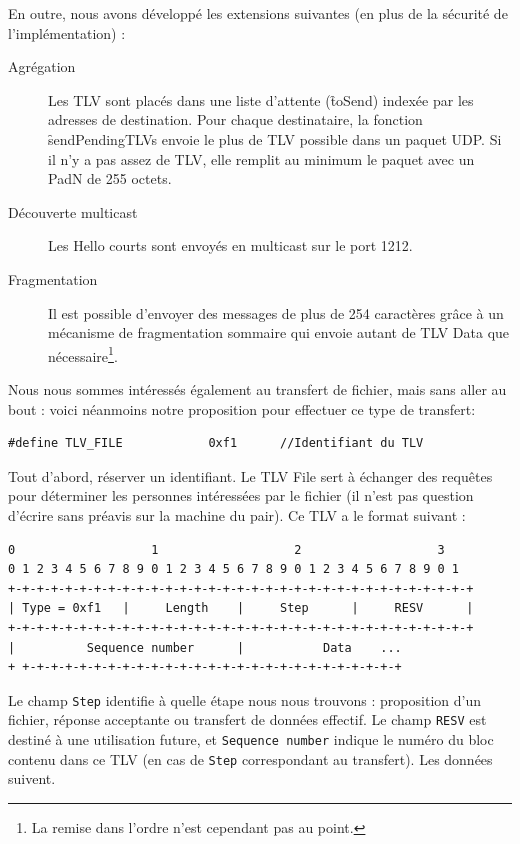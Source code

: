 \documentclass[11pt,a4paper]{article}
\begin{document}
En outre, nous avons développé les extensions suivantes (en plus de la sécurité de l'implémentation) :
\begin{description}
\item[Agrégation] Les TLV sont placés dans une liste d'attente (\f{toSend}) indexée par les adresses de destination. Pour chaque destinataire, la fonction \f{sendPendingTLVs}
envoie le plus de TLV possible dans un paquet UDP. Si il n'y a pas assez de TLV, elle remplit au minimum le paquet avec un PadN de 255 octets.
\item[Découverte multicast]Les Hello courts sont envoyés en multicast sur le port 1212.

\item[Fragmentation] Il est possible d'envoyer des messages de plus de 254 caractères grâce à un mécanisme de fragmentation sommaire qui envoie autant de 
TLV Data que nécessaire\footnote{La remise dans l'ordre n'est cependant pas au point.}.
\end{description}

Nous nous sommes intéressés également au transfert de fichier, mais sans aller au bout : voici néanmoins notre proposition pour effectuer ce type de transfert:

\begin{lstlisting}
#define TLV_FILE			0xf1      //Identifiant du TLV
\end{lstlisting}

Tout d'abord, réserver un identifiant. Le TLV File sert à échanger des requêtes pour déterminer les personnes intéressées par le fichier (il n'est pas question
d'écrire sans préavis sur la machine du pair). Ce TLV a le format suivant :

\begin{verbatim}
0                   1                   2                   3
0 1 2 3 4 5 6 7 8 9 0 1 2 3 4 5 6 7 8 9 0 1 2 3 4 5 6 7 8 9 0 1
+-+-+-+-+-+-+-+-+-+-+-+-+-+-+-+-+-+-+-+-+-+-+-+-+-+-+-+-+-+-+-+-+
| Type = 0xf1   |     Length    |     Step      |     RESV      |
+-+-+-+-+-+-+-+-+-+-+-+-+-+-+-+-+-+-+-+-+-+-+-+-+-+-+-+-+-+-+-+-+
|          Sequence number      |           Data    ...	         
+ +-+-+-+-+-+-+-+-+-+-+-+-+-+-+-+-+-+-+-+-+-+-+-+-+-+-+
\end{verbatim}

Le champ \texttt{Step} identifie à quelle étape nous nous trouvons : proposition d'un fichier, réponse acceptante ou transfert
de données effectif. Le champ \texttt{RESV} est destiné à une
utilisation future, et \texttt{Sequence number} indique le numéro du bloc contenu dans ce TLV (en cas de \texttt{Step} correspondant au transfert).
Les données suivent.
\end{document}
